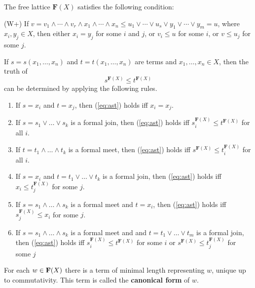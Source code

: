 \begin{theorem}  \label{thm:whitman2}
  The free lattice $\mathbf{F}(X)$ satisfies the following condition:
  
  (W+)  If $v = v_1 \wedge \cdots \wedge v_r \wedge x_1 \wedge \cdots
  \wedge x_n \leqslant u_1 \vee \cdots \vee u_s \vee
  y_1 \vee \cdots \vee y_m = u$, where $x_i, y_j\in X$, then either 
  $x_i = y_j$ for some $i$ and $j$, or $v_i \leqslant u$ for some $i$, or
  $v \leqslant u_j$ for some $j$. 
  \end{theorem}
  
\begin{theorem}
  \label{thm:wordprob}
If $s = s(x_1, \dots, x_n)$ and $t = t(x_1, \dots, x_n)$ are terms and $x_1, \dots, x_n \in X$, then the truth of 
\begin{equation}
  \label{eq:ast}
s^{\mathbf{F}(X)} \leqslant t^{\mathbf{F}(X)}
\end{equation}
can be determined by applying the following rules.
\begin{enumerate}
\item If $s=x_i$ and $t=x_j$, then (\ref{eq:ast}) holds iff $x_i = x_j$.
\item If $s = s_1 \vee \dots \vee s_k$ is a formal join, then (\ref{eq:ast}) holds iff $s_i^{\mathbf{F}(X)} \leqslant t^{\mathbf{F}(X)}$ for all $i$.
\item If $t = t_1 \wedge \dots \wedge t_k$ is a formal meet, then (\ref{eq:ast}) holds iff 
$s^{\mathbf{F}(X)} \leqslant t_i^{\mathbf{F}(X)}$ for all $i$.
\item If $s = x_i$ and $t = t_1 \vee \dots \vee t_k$ is a formal join, 
   then (\ref{eq:ast}) holds iff $x_i \leqslant t_j^{\mathbf{F}(X)}$ for some $j$.
\item If $s = s_1 \wedge \dots \wedge s_k$ is a formal meet and $t = x_i$, then (\ref{eq:ast}) holds iff $s_j^{\mathbf{F}(X)} \leqslant x_i$ for some $j$.
\item If $s = s_1 \wedge \dots \wedge s_k$ is a formal meet and 
and $t = t_1 \vee \dots \vee t_m$ is a formal join, then (\ref{eq:ast}) holds iff 
$s_i^{\mathbf{F}(X)} \leqslant t^{\mathbf{F}(X)}$ for some $i$
or $s^{\mathbf{F}(X)} \leqslant t_j^{\mathbf{F}(X)}$ for some $j$
\end{enumerate}
\end{theorem}

\begin{theorem} For each $w \in \mathbf{F} (X)$ 
  there is a term of minimal length representing $w$, unique up to commutativity. 
  This term is called the \textbf{canonical form} of $w$.
\end{theorem}


